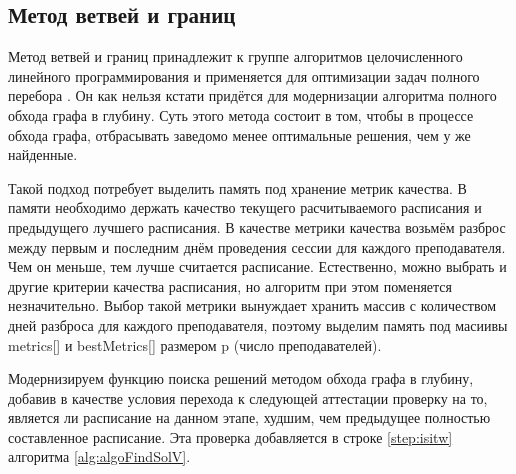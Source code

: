 \subsection{Метод ветвей и границ}
Метод ветвей и границ принадлежит к группе алгоритмов целочисленного линейного программирования и применяется для оптимизации задач полного перебора \cite{branch}. Он как нельзя кстати придётся для модернизации алгоритма полного обхода графа в глубину.
Суть этого метода состоит в том, чтобы в процессе обхода графа, отбрасывать заведомо менее оптимальные решения, чем у же найденные.

Такой подход потребует выделить память под хранение метрик качества. В памяти необходимо держать качество текущего расчитываемого расписания и предыдущего лучшего расписания.
В качестве метрики качества возьмём разброс между первым и последним днём проведения сессии для каждого преподавателя. Чем он меньше, тем лучше считается расписание. Естественно, можно выбрать и другие критерии качества расписания, но алгоритм при этом поменяется незначительно.
Выбор такой метрики вынуждает хранить массив с количеством дней разброса для каждого преподавателя, поэтому выделим память под масиивы metrics[] и bestMetrics[] размером p (число преподавателей).

Модернизируем функцию поиска решений методом обхода графа в глубину, 
добавив в качестве условия перехода к следующей аттестации проверку на то, является ли расписание на данном этапе, худшим, чем предыдущее полностью составленное расписание. Эта проверка добавляется в строке \ref{step:isitw} алгоритма \ref{alg:algoFindSolV}.

